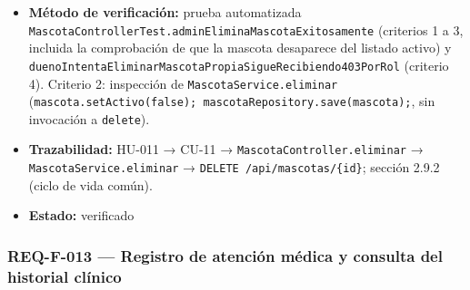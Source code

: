 \documentclass[
  spanish,
]{article}
\providecommand{\tightlist}{%
  \setlength{\itemsep}{0pt}\setlength{\parskip}{0pt}}
\begin{document}
\begin{itemize}
  \begin{enumerate}
  \def\labelenumi{\arabic{enumi}.}
  \tightlist
  \item
    Dado un \texttt{ROLE\_\allowbreak{}ADMIN} y una mascota activa, cuando envía
    \texttt{DELETE\ /\allowbreak{}api/\allowbreak{}mascotas/\allowbreak{}\{id\}}, entonces la respuesta es
    \texttt{204\ No\ Content}.
  \item
    Tras la baja, la fila sigue existiendo en la tabla \texttt{mascotas}
    con \texttt{activo\ =\ false}; no se ejecuta ningún \texttt{DELETE}
    físico.
  \item
    Tras la baja, la mascota deja de aparecer en
    \texttt{GET\ /\allowbreak{}api/\allowbreak{}mascotas} y \texttt{GET\ /\allowbreak{}api/\allowbreak{}mascotas/\allowbreak{}\{id\}}
    responde \texttt{404}.
  \item
    Dado un usuario con rol \texttt{ROLE\_\allowbreak{}DUENO}, cuando intenta dar de
    baja incluso su propia mascota, entonces la respuesta es
    \texttt{403}.
  \end{enumerate}
\item
  \textbf{Método de verificación:} prueba automatizada
  \texttt{Mascota\allowbreak{}Controller\allowbreak{}Test.\allowbreak{}admin\allowbreak{}Elimina\allowbreak{}Mascota\allowbreak{}Exitosamente}
  (criterios 1 a 3, incluida la comprobación de que la mascota
  desaparece del listado activo) y
  \texttt{dueno\allowbreak{}Intenta\allowbreak{}Eliminar\allowbreak{}Mascota\allowbreak{}Propia\allowbreak{}Sigue\allowbreak{}Recibiendo403\allowbreak{}Por\allowbreak{}Rol}
  (criterio 4). Criterio 2: inspección de
  \texttt{Mascota\allowbreak{}Service.\allowbreak{}eliminar}
  (\texttt{mascota.\allowbreak{}set\allowbreak{}Activo(false);\allowbreak{}\ mascota\allowbreak{}Repository.\allowbreak{}save(mascota);},
  sin invocación a \texttt{delete}).
\item
  \textbf{Trazabilidad:} HU-011 → CU-11 →
  \texttt{Mascota\allowbreak{}Controller.\allowbreak{}eliminar} → \texttt{Mascota\allowbreak{}Service.\allowbreak{}eliminar}
  → \texttt{DELETE\ /\allowbreak{}api/\allowbreak{}mascotas/\allowbreak{}\{id\}}; sección 2.9.2 (ciclo de vida
  común).
\item
  \textbf{Estado:} verificado
\end{itemize}

\subsubsection{REQ-F-013 --- Registro de atención médica y consulta del
historial
clínico}\label{req-f-013-registro-de-atenciuxf3n-muxe9dica-y-consulta-del-historial-cluxednico}
\end{document}
